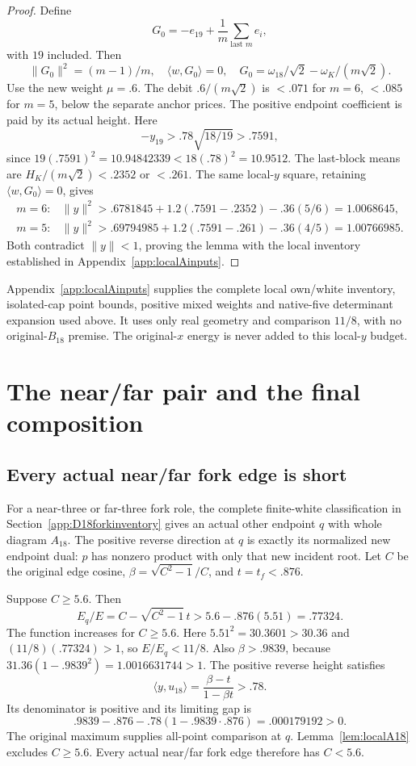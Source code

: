 \documentclass[11pt]{article}
\theoremstyle{definition}
\theoremstyle{remark}
\newcommand{\ip}[2]{\langle #1,#2\rangle}
\newcommand{\norm}[1]{\lVert #1\rVert}
\begin{document}
\begin{proof}
Define
\[
 G_0=-e_{19}+\frac1m\sum_{\text{last }m}e_i,
\]
with \(19\) included. Then
\[
 \norm{G_0}^2=(m-1)/m,\quad \ip{w}{G_0}=0,\quad
 G_0=\omega_{18}/\sqrt2-\omega_K/(m\sqrt2).
\]
Use the new weight \(\mu=.6\).
The debit \(.6/(m\sqrt2)\) is \(<.071\) for \(m=6\),
\(<.085\) for \(m=5\), below the separate anchor prices.
The positive endpoint coefficient is paid by its actual height.
Here
\[
 -y_{19}>.78\sqrt{18/19}>.7591,
\]
since \(19(.7591)^2=10.94842339<18(.78)^2=10.9512\).
The last-block means are
\(H_K/(m\sqrt2)<.2352\) or \(<.261\).
The same local-\(y\) square, retaining \(\ip{w}{G_0}=0\), gives
\[
\begin{array}{ll}
m=6:&\norm{y}^2>
 .6781845+1.2(.7591-.2352)-.36(5/6)=1.0068645,\\
m=5:&\norm{y}^2>
 .69794985+1.2(.7591-.261)-.36(4/5)=1.00766985.
\end{array}
\]
Both contradict \(\norm{y}<1\), proving the lemma with the
local inventory established in Appendix~\ref{app:localAinputs}.
\end{proof}
Appendix~\ref{app:localAinputs} supplies the complete
local own/white inventory, isolated-cap point bounds,
positive mixed weights and native-five determinant
expansion used above. It uses only real geometry and
comparison \(11/8\), with no original-\(B_{18}\) premise.
The original-\(x\) energy is never added to this local-\(y\) budget.

\section{The near/far pair and the final composition}
\label{sec:composition}
\subsection{Every actual near/far fork edge is short}
For a near-three or far-three fork role, the complete finite-white
classification in Section~\ref{app:D18forkinventory} gives an
actual other endpoint \(q\)
with whole diagram \(A_{18}\). The positive reverse direction
at \(q\) is exactly its normalized new endpoint dual: \(p\)
has nonzero product with only that new incident root.
Let \(C\) be the original edge cosine,
\(\beta=\sqrt{C^2-1}/C\), and \(t=t_f<.876\).

Suppose \(C\geq5.6\). Then
\[
 E_q/E=C-\sqrt{C^2-1}\,t
       >5.6-.876(5.51)=.77324.
\]
The function increases for \(C\geq5.6\).
Here \(5.51^2=30.3601>30.36\) and
\((11/8)(.77324)>1\), so \(E/E_q<11/8\).
Also \(\beta>.9839\), because
\(31.36(1-.9839^2)=1.0016631744>1\).
The positive reverse height satisfies
\[
 \ip{y}{u_{18}}=\frac{\beta-t}{1-\beta t}>.78.
\]
Its denominator is positive and its limiting gap is
\[
 .9839-.876-.78(1-.9839\cdot.876)=.000179192>0.
\]
The original maximum supplies all-point comparison at \(q\).
Lemma~\ref{lem:localA18} excludes \(C\geq5.6\).
Every actual near/far fork edge therefore has \(C<5.6\).
\end{document}
